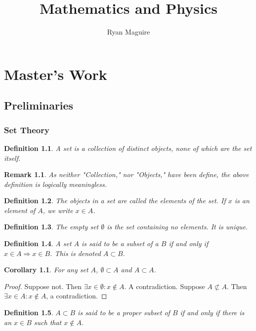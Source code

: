 \documentclass[12pt,oneside]{book}
\title{Mathematics and Physics}
\author{Ryan Maguire}
\date{\vspace{-5ex}}
\theoremstyle{mystyle}
\newtheorem{definition}{Definition}[section]
\newtheorem{corollary}{Corollary}[section]
\newtheorem{remark}{Remark}[section]
\begin{document}
\maketitle
\tableofcontents
\listoffigures
\listoftables
\clearpage
\setlength{\parindent}{0em}
\setlength{\parskip}{0em}
%
\chapter{Master's Work}
%
\section{Preliminaries}
%
\subsection{Set Theory}
%
\begin{definition}
A set is a collection of distinct objects, none of which are the set itself.
\end{definition}
%
\begin{remark}
As neither "Collection," nor "Objects," have been define, the above definition is logically meaningless.
\end{remark}
%
\begin{definition}
The objects in a set are called the elements of the set. If $x$ is an element of $A$, we write $x\in A$.
\end{definition}

\begin{definition}
The empty set $\emptyset$ is the set containing no elements. It is unique.
\end{definition}

\begin{definition}
A set $A$ is said to be a subset of a $B$ if and only if $x\in A\Rightarrow x\in B$. This is denoted $A\subset B$.
\end{definition}

\begin{corollary}
For any set $A$, $\emptyset \subset A$ and $A\subset A$.
\end{corollary}
\begin{proof}
Suppose not. Then $\exists x\in \emptyset: x\notin A$. A contradiction. Suppose $A\not\subset A$. Then $\exists x\in A:x\notin A$, a contradiction.
\end{proof}

\begin{definition}
$A\subset B$ is said to be a proper subset of $B$ if and only if there is an $x\in B$ such that $x\notin A$.
\end{definition}
\end{document}
